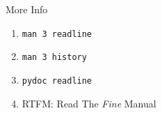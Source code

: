 \documentclass[aspectratio=1610]{beamer}
\begin{document}
\begin{frame}{More Info}
    \begin{enumerate}
        \item \texttt{man 3 readline}
        \item \texttt{man 3 history}
        \item \texttt{pydoc readline}
        \item RTFM: Read The \emph{Fine} Manual
    \end{enumerate}
\end{frame}

{
\begin{frame}

    \begin{center}
        \Huge\headingfont
        \color{white}{Questions?}
    \end{center}

\end{frame}
}
\end{document}
